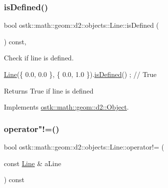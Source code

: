 \subsubsection{\texorpdfstring{is\+Defined()}{isDefined()}}
{\footnotesize\ttfamily bool ostk\+::math\+::geom\+::d2\+::objects\+::\+Line\+::is\+Defined (\begin{DoxyParamCaption}{ }\end{DoxyParamCaption}) const\hspace{0.3cm}{\ttfamily [override]}, {\ttfamily [virtual]}}



Check if line is defined. 


\begin{DoxyCode}
\hyperlink{classostk_1_1math_1_1geom_1_1d2_1_1objects_1_1_line_aa1570ebec4d4f57cbed3c188e6b65613}{Line}(\{ 0.0, 0.0 \}, \{ 0.0, 1.0 \}).\hyperlink{classostk_1_1math_1_1geom_1_1d2_1_1objects_1_1_line_a1e2a44eac16df2d9009eebf3aa85afd2}{isDefined}() ; \textcolor{comment}{// True}
\end{DoxyCode}


\begin{DoxyReturn}{Returns}
True if line is defined 
\end{DoxyReturn}


Implements \hyperlink{classostk_1_1math_1_1geom_1_1d2_1_1_object_a456cc7121218d24c1322d0fe54230cc4}{ostk\+::math\+::geom\+::d2\+::\+Object}.

\mbox{\label{classostk_1_1math_1_1geom_1_1d2_1_1objects_1_1_line_a0e58e32726efa279b8f21f1b1c60cb36}} 
\subsubsection{\texorpdfstring{operator"!=()}{operator!=()}}
{\footnotesize\ttfamily bool ostk\+::math\+::geom\+::d2\+::objects\+::\+Line\+::operator!= (\begin{DoxyParamCaption}\item[{const \hyperlink{classostk_1_1math_1_1geom_1_1d2_1_1objects_1_1_line}{Line} \&}]{a\+Line }\end{DoxyParamCaption}) const}



